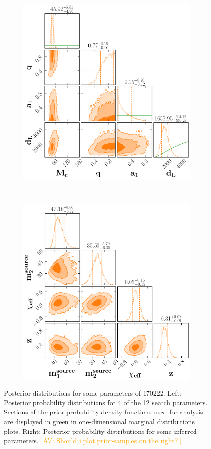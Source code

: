 \documentclass[%
 nofootinbib,
 amsmath,amssymb,
 aps,
 twocolumn,
 superscriptaddress
]{revtex4-2}
\newcommand{\avi}[1]{\textcolor{orange}{[AV: #1]}}
\begin{document}
\begin{figure}
    \centering
    \begin{subfigure}
        \centering
        \includegraphics[width=0.45\linewidth]{170222_prior_posterior.png}
    \end{subfigure}
    ~ 
    \begin{subfigure}
        \centering
        \includegraphics[width=0.45\linewidth]{170222_source_posterior.png}
    \end{subfigure}
    \caption{Posterior distributions for some parameters of 170222. 
    Left: Posterior probability distributions for 4 of the 12 search parameters. Sections of the prior probability density functions used for analysis are displayed in green in one-dimensional marginal distributions plots.
    Right: Posterior probability distributions for some inferred parameters. \avi{Should i plot prior-samples on the right? }
    \label{fig:170222}}
\end{figure}



\end{document}
